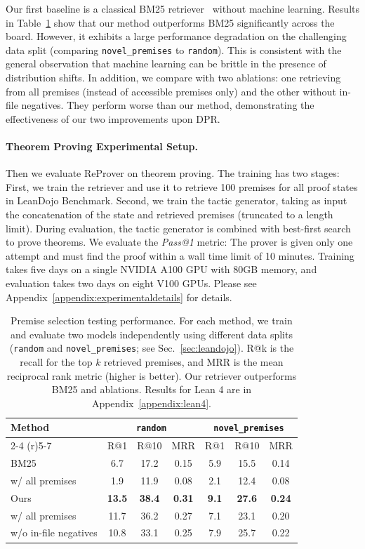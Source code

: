 \documentclass{article}
\newcommand{\smallsec}[1]{\vspace{-1mm} \paragraph{#1.}}
\newcommand\name{ReProver}
\begin{document}
Our first baseline is a classical BM25 retriever~\cite{robertson2009probabilistic} without machine learning. Results in Table~\ref{table:premise_selection_results} show that our method outperforms BM25 significantly across the board. However, it exhibits a large performance degradation on the challenging data split (comparing \texttt{novel\_premises} to \texttt{random}). This is consistent with the general observation that machine learning can be brittle in the presence of distribution shifts. In addition, we compare with two ablations: one retrieving from all premises (instead of accessible premises only) and the other without in-file negatives. They perform worse than our method, demonstrating the effectiveness of our two improvements upon DPR.



\smallsec{Theorem Proving Experimental Setup}
Then we evaluate {\name} on theorem proving. The training has two stages: First, we train the retriever and use it to retrieve 100 premises for all proof states in LeanDojo Benchmark. Second, we train the tactic generator, taking as input the concatenation of the state and retrieved premises (truncated to a length limit). During evaluation, the tactic generator is combined with best-first search to prove theorems. We evaluate the \emph{Pass@1} metric: The prover is given only one attempt and must find the proof within a wall time limit of 10 minutes. Training takes five days on a single NVIDIA A100 GPU with 80GB memory, and evaluation takes two days on eight V100 GPUs. Please see Appendix~\ref{appendix:experimentaldetails} for details.


\begin{table}[ht]
  \centering
  \caption{Premise selection testing performance. For each method, we train and evaluate two models independently using different data splits (\texttt{random} and \texttt{novel\_premises}; see Sec.~\ref{sec:leandojo}). R@k is the recall for the top $k$ retrieved premises, and MRR is the mean reciprocal rank metric (higher is better). Our retriever outperforms BM25 and ablations. Results for Lean 4 are in Appendix~\ref{appendix:lean4}.}
  \begin{tabular}{@{}lcccccc@{}}
    \toprule
     Method & \multicolumn{3}{c}{\texttt{random}} & \multicolumn{3}{c}{\texttt{novel\_premises}} \\
     \cmidrule(r){2-4} \cmidrule(r){5-7} & R@1 & R@10 & MRR & R@1 & R@10 & MRR \\
    \midrule
    BM25 & 6.7 & 17.2 & 0.15 & 5.9 & 15.5 & 0.14\\
    \quad w/ all premises & 1.9 & 11.9 & 0.08 & 2.1 & 12.4 & 0.08 \\
    Ours & \textbf{13.5} & \textbf{38.4} & \textbf{0.31} & \textbf{9.1} & \textbf{27.6} & \textbf{0.24} \\
    \quad w/ all premises & 11.7 & 36.2 & 0.27 & 7.1 & 23.1 & 0.20 \\
    \quad w/o in-file negatives & 10.8 & 33.1 & 0.25 & 7.9 & 25.7 & 0.22 \\
    \bottomrule
  \end{tabular}
  \label{table:premise_selection_results}
\end{table}
\end{document}
